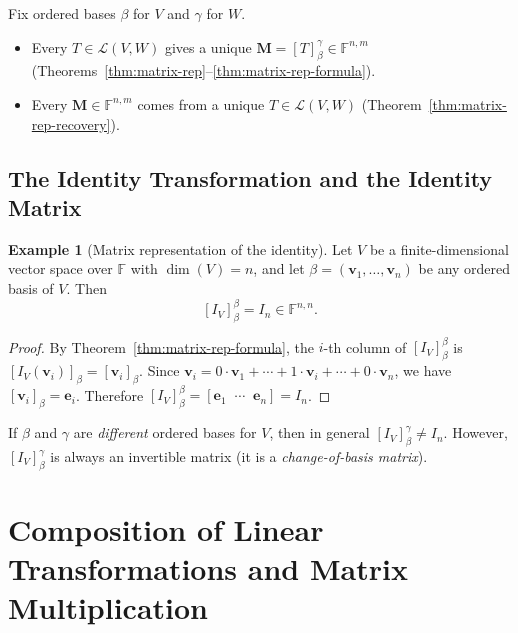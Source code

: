 \documentclass[11pt, a4paper, notitlepage]{report}
\theoremstyle{definition}
\newtheorem{example}[theorem]{Example}
\theoremstyle{remark}
\begin{document}
\begin{keyresult}[title={Key Result: Abstract $\leftrightarrow$ Concrete (both directions)}]
Fix ordered bases $\beta$ for $V$ and $\gamma$ for $W$.
\begin{itemize}
  \item Every $T\in\mathcal{L}(V,W)$ gives a unique $\mathbf{M}=[T]_\beta^\gamma\in\mathbb{F}^{n,m}$
        (Theorems~\ref{thm:matrix-rep}--\ref{thm:matrix-rep-formula}).
  \item Every $\mathbf{M}\in\mathbb{F}^{n,m}$ comes from a unique $T\in\mathcal{L}(V,W)$
        (Theorem~\ref{thm:matrix-rep-recovery}).
\end{itemize}
\end{keyresult}

\subsection{The Identity Transformation and the Identity Matrix}

\begin{example}[Matrix representation of the identity]
\label{ex:identity-matrix-rep}
Let $V$ be a finite-dimensional vector space over $\mathbb{F}$ with $\dim(V)=n$, and let
$\beta = (\mathbf{v}_1, \ldots, \mathbf{v}_n)$ be any ordered basis of $V$.  Then
\[
  [I_V]_\beta^\beta = I_n \in \mathbb{F}^{n,n}.
\]
\end{example}

\begin{proof}
By Theorem~\ref{thm:matrix-rep-formula}, the $i$-th column of $[I_V]_\beta^\beta$ is
$[I_V(\mathbf{v}_i)]_\beta = [\mathbf{v}_i]_\beta$.  Since
$\mathbf{v}_i = 0 \cdot \mathbf{v}_1 + \cdots + 1 \cdot \mathbf{v}_i + \cdots + 0 \cdot \mathbf{v}_n$,
we have $[\mathbf{v}_i]_\beta = \mathbf{e}_i$.  Therefore
$[I_V]_\beta^\beta = [\mathbf{e}_1 \;\; \cdots \;\; \mathbf{e}_n] = I_n$.
\end{proof}

\begin{warning}[title={Warning: Mixed Bases and the Identity}]
If $\beta$ and $\gamma$ are \emph{different} ordered bases for $V$, then in general
$[I_V]_\beta^\gamma \neq I_n$.  However, $[I_V]_\beta^\gamma$ is always an invertible matrix
(it is a \emph{change-of-basis matrix}).
\end{warning}


\section{Composition of Linear Transformations and Matrix Multiplication}
\label{sec:composition-matrix-mult}
\end{document}
